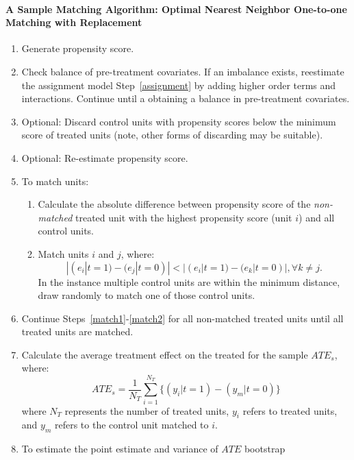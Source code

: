 \documentclass[11pt,titlepage]{article}
\begin{document}
\paragraph{A Sample Matching Algorithm: Optimal Nearest Neighbor One-to-one
  Matching with Replacement}
\begin{enumerate}
\item Generate propensity score. \label{assignment}
\item Check balance of pre-treatment covariates.  If an imbalance
  exists, reestimate the assignment model Step~\ref{assignment} by
  adding higher order terms and interactions.  Continue until a
  obtaining a balance in pre-treatment covariates.
\item Optional: Discard control units with propensity scores below the
  minimum score of treated units (note, other forms of discarding may
  be suitable).
\item Optional: Re-estimate propensity score.
\item To match units: \label{match}
  \begin{enumerate}
  \item Calculate the absolute difference between propensity score of
    the \emph{non-matched} treated unit with the highest propensity
    score (unit $i$) and all control units. \label{match1}
  \item Match units $i$ and $j$, where:
    \begin{equation}
      | (e_i | t=1)-(e_j | t=0) | < | (e_i | t=1)-(e_k | t=0) |,  \forall k \ne j.  
    \end{equation}
    In the instance multiple control units are within the minimum
    distance, draw randomly to match one of those control units.
    \label{match2}
  \end{enumerate}
\item Continue Steps~\ref{match1}-\ref{match2} for all non-matched
  treated units until all treated units are matched. \label{match3}
\item Calculate the average treatment effect on the treated for the
  sample $ATE_s$, where:
  \begin{equation}
    ATE_s=\frac{1}{N_T} \sum_{i=1}^{N_T} \big\{ (y_i|t=1) - (y_m|t=0)
    \big \}
  \end{equation}
  where $N_T$ represents the number of treated units, $y_i$ refers to
  treated units, and $y_m$ refers to the control unit matched to $i$.
\item To estimate the point estimate and variance of $ATE$ bootstrap

\end{enumerate}
\end{document}
